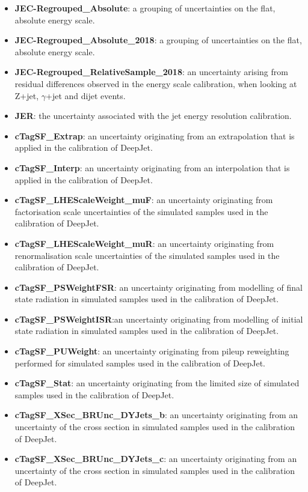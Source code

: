\begin{itemize}
    \item \textbf{JEC-Regrouped\_Absolute}: a grouping of uncertainties on the flat, absolute energy scale. 
    \item \textbf{JEC-Regrouped\_Absolute\_2018}: a grouping of uncertainties on the flat, absolute energy scale.
    \item \textbf{JEC-Regrouped\_RelativeSample\_2018}: an uncertainty arising from residual differences observed in the energy scale calibration, when looking at Z+jet, $\gamma$+jet and dijet events. 
    \item \textbf{JER}: the uncertainty associated with the jet energy resolution calibration.
    \item \textbf{cTagSF\_Extrap}: an uncertainty originating from an extrapolation that is applied in the calibration of \textsf{DeepJet}.
    \item \textbf{cTagSF\_Interp}: an uncertainty originating from an interpolation that is applied in the calibration of \textsf{DeepJet}.
    \item \textbf{cTagSF\_LHEScaleWeight\_muF}: an uncertainty originating from factorisation scale uncertainties of the simulated samples used in the calibration of \textsf{DeepJet}.
    \item \textbf{cTagSF\_LHEScaleWeight\_muR}: an uncertainty originating from renormalisation scale uncertainties of the simulated samples used in the calibration of \textsf{DeepJet}.
    \item \textbf{cTagSF\_PSWeightFSR}: an uncertainty originating from modelling of final state radiation in simulated samples used in the calibration of \textsf{DeepJet}.
    \item \textbf{cTagSF\_PSWeightISR}:an uncertainty originating from modelling of initial state radiation in simulated samples used in the calibration of \textsf{DeepJet}.
    \item \textbf{cTagSF\_PUWeight}: an uncertainty originating from pileup reweighting performed for simulated samples used in the calibration of \textsf{DeepJet}.
    \item \textbf{cTagSF\_Stat}: an uncertainty originating from the limited size of simulated samples used in the calibration of \textsf{DeepJet}.
    \item \textbf{cTagSF\_XSec\_BRUnc\_DYJets\_b}: an uncertainty originating from an uncertainty of the cross section in simulated samples used in the calibration of \textsf{DeepJet}.
    \item \textbf{cTagSF\_XSec\_BRUnc\_DYJets\_c}: an uncertainty originating from an uncertainty of the cross section in simulated samples used in the calibration of \textsf{DeepJet}. 

\end{itemize}
